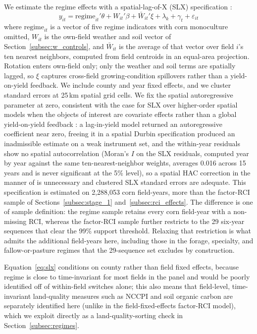 \documentclass[12pt,letterpaper]{article}
\theoremstyle{remark}
\theoremstyle{remark}
\theoremstyle{plain}
\theoremstyle{definition}
\begin{document}
We estimate the regime effects with a spatial-lag-of-X (SLX) specification \citep{HalleckVega2015, LeSagePace2009, Elhorst2014}:
%
\begin{equation}
  y_{it} = \text{regime}_{it}'\theta + W_{it}'\beta + \bar W_{it}'\xi
  + \lambda_k + \gamma_t + \varepsilon_{it}
  \label{eq:slx}
\end{equation}
%
where $\text{regime}_{it}$ is a vector of five regime indicators with corn monoculture omitted, $W_{it}$ is the own-field weather and soil vector of Section~\ref{subsec:w_controls}, and $\bar W_{it}$ is the average of that vector over field $i$'s ten nearest neighbors, computed from field centroids in an equal-area projection. Rotation enters own-field only; only the weather and soil terms are spatially lagged, so $\xi$ captures cross-field growing-condition spillovers rather than a yield-on-yield feedback. We include county and year fixed effects, and we cluster standard errors at 25\,km spatial grid cells. We fix the spatial autoregressive parameter at zero, consistent with the case for SLX over higher-order spatial models when the objects of interest are covariate effects rather than a global yield-on-yield feedback \citep{GibbonsOverman2012}: a lag-in-yield model returned an autoregressive coefficient near zero, freeing it in a spatial Durbin specification produced an inadmissible estimate on a weak instrument set, and the within-year residuals show no spatial autocorrelation (Moran's $I$ on the SLX residuals, computed year by year against the same ten-nearest-neighbor weights, averages 0.016 across 15 years and is never significant at the 5\% level), so a spatial HAC correction in the manner of \citet{Conley1999} is unnecessary and clustered SLX standard errors are adequate. This specification is estimated on 2,288,053 corn field-years, more than the factor-RCI sample of Sections~\ref{subsec:stage_1} and~\ref{subsec:rci_effects}. The difference is one of sample definition: the regime sample retains every corn field-year with a non-missing RCI, whereas the factor-RCI sample further restricts to the 29 six-year sequences that clear the 99\% support threshold. Relaxing that restriction is what admits the additional field-years here, including those in the forage, specialty, and fallow-or-pasture regimes that the 29-sequence set excludes by construction.

Equation~\eqref{eq:slx} conditions on county rather than field fixed effects, because regime is close to time-invariant for most fields in the panel and would be poorly identified off of within-field switches alone; this also means that field-level, time-invariant land-quality measures such as NCCPI and soil organic carbon are separately identified here (unlike in the field-fixed-effects factor-RCI model), which we exploit directly as a land-quality-sorting check in Section~\ref{subsec:regimes}.
\end{document}
